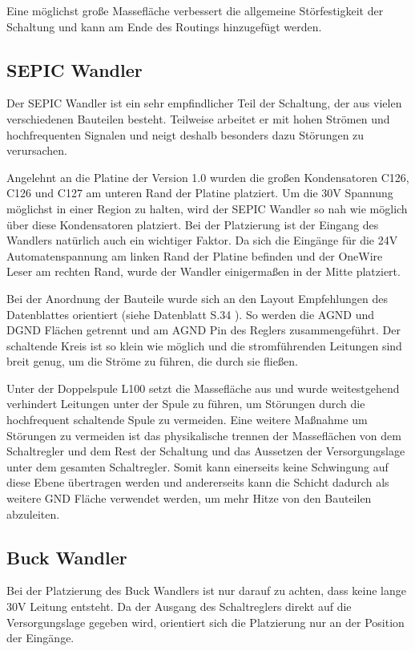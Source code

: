 Eine möglichst große Massefläche verbessert die allgemeine Störfestigkeit der Schaltung und kann am Ende des Routings hinzugefügt
werden. 

\subsection{\ac{SEPIC} Wandler}
Der \ac{SEPIC} Wandler ist ein sehr empfindlicher Teil der Schaltung, der aus vielen verschiedenen Bauteilen besteht. 
Teilweise arbeitet er mit hohen Strömen und hochfrequenten Signalen und neigt deshalb besonders dazu Störungen zu verursachen. 

Angelehnt an die Platine der Version 1.0 wurden die großen Kondensatoren C126, C126 und C127 am unteren Rand der Platine platziert.
Um die 30V Spannung möglichst in einer Region zu halten, wird der \ac{SEPIC} Wandler so nah wie möglich über diese Kondensatoren
platziert. Bei der Platzierung ist der Eingang des Wandlers natürlich auch ein wichtiger Faktor. Da sich die Eingänge für die 
24V Automatenspannung am linken Rand der Platine befinden und der OneWire Leser am rechten Rand, wurde der Wandler einigermaßen 
in der Mitte platziert.

Bei der Anordnung der Bauteile wurde sich an den Layout Empfehlungen des Datenblattes orientiert (siehe Datenblatt S.34 \cite{LM5157}).
So werden die AGND und DGND Flächen getrennt und am AGND Pin des Reglers zusammengeführt. Der schaltende Kreis ist so klein wie 
möglich und die stromführenden Leitungen sind breit genug, um die Ströme zu führen, die durch sie fließen.

Unter der Doppelspule L100 setzt die Massefläche aus und wurde weitestgehend verhindert Leitungen unter der Spule zu führen, um
Störungen durch die hochfrequent schaltende Spule zu vermeiden. Eine weitere Maßnahme um Störungen zu vermeiden ist das 
physikalische trennen der Masseflächen von dem Schaltregler und dem Rest der Schaltung und das Aussetzen der Versorgungslage
unter dem gesamten Schaltregler. Somit kann einerseits keine Schwingung auf diese Ebene übertragen werden und andererseits
kann die Schicht dadurch als weitere GND Fläche verwendet werden, um mehr Hitze von den Bauteilen abzuleiten.

\subsection{Buck Wandler}
Bei der Platzierung des Buck Wandlers ist nur darauf zu achten, dass keine lange 30V Leitung entsteht. Da der Ausgang des 
Schaltreglers direkt auf die Versorgungslage gegeben wird, orientiert sich die Platzierung nur an der Position der Eingänge.

